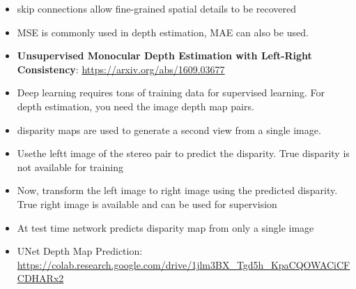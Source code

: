 \documentclass[a4paper]{article}
\begin{document}
\begin{itemize}
    \item skip connections allow fine-grained spatial details to be recovered
    \item MSE is commonly used in depth estimation, MAE can also be used.
    \item \textbf{Unsupervised Monocular Depth Estimation with Left-Right Consistency}: \url{https://arxiv.org/abs/1609.03677}
    \item Deep learning requires tons of training data for supervised learning. For depth estimation, you need the image depth map pairs.
    \item disparity maps are used to generate a second view from a single image.
    \item Usethe leftt image of the stereo pair to predict the disparity. True disparity is not available for training
    \item Now, transform the left image to right image using the predicted disparity. True right image is available and can be used for supervision
    \item At test time network predicts disparity map from only a single image
    \item UNet Depth Map Prediction: \url{https://colab.research.google.com/drive/1jlm3BX_Tgd5h_KpaCQOWACiCFCDHARx2}
\end{itemize}
\end{document}
